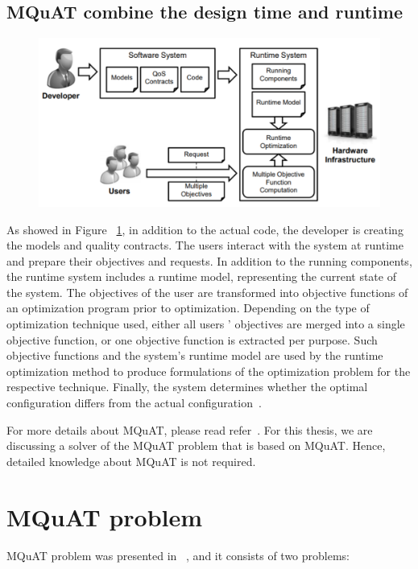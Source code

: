 \subsection{MQuAT combine the design time and runtime}
\begin{figure}
	\centering
	\includegraphics[width=\textwidth]{images/CombinedMQuAT}
	\caption[Layers of MQuAT]{}
	\label{fig:CombinedMQuAT}
\end{figure}
As showed in Figure ~\ref{fig:CombinedMQuAT}, in addition to the actual code, the developer is creating the models and quality contracts. The users interact with the system at runtime and prepare their objectives and requests. 
In addition to the running components, the runtime system includes a runtime model, representing the current state of the system. The objectives of the user are transformed into objective functions of an optimization program prior to optimization. Depending on the type of optimization technique used, either all users ' objectives are merged into a single objective function, or one objective function is extracted per purpose. Such objective functions and the system's runtime model are used by the runtime optimization method to produce formulations of the optimization problem for the respective technique. Finally, the system determines whether the optimal configuration differs from the actual configuration~\cite{gotz13, ahmad18}.

For more details about MQuAT, please read refer~\cite{gotz13}. For this thesis, we are discussing a solver of the MQuAT problem that is based on MQuAT. Hence, detailed knowledge about MQuAT is not required. 


\section{MQuAT problem}

MQuAT problem was presented in ~\cite{gotz18}, and it consists of two problems:


